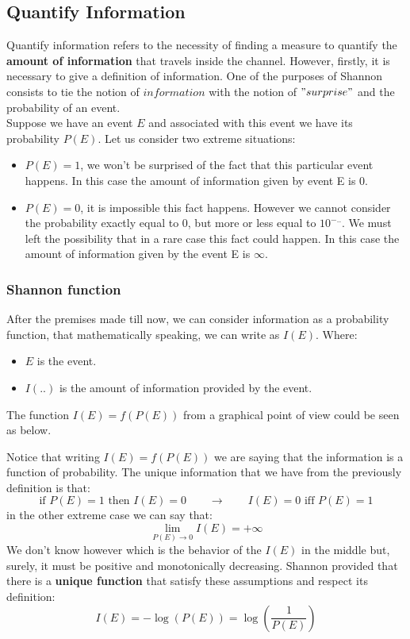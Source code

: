 \subsection{Quantify Information}
Quantify information refers to the necessity of finding a measure to quantify the \textbf{amount of information} that travels inside the channel. However, firstly, it is necessary to give a definition of information.
One of the purposes of Shannon consists to tie the notion of $information$ with the notion of $"surprise"$ and the probability of an event.\\
Suppose we have an event $E$ and associated with this event we have its probability $P(E)$. Let us consider two extreme situations:
\begin{itemize}
	\item $P(E) = 1$, we won't be surprised of the fact that this particular event happens. In this case the amount of information given by event E is 0.
	\item $P(E) = 0$, it is impossible this fact happens. However we cannot consider the probability exactly equal to 0, but more or less equal to $10^{-..}$. We must left the possibility that in a rare case this fact could happen. In this case the amount of information given by the event E is $\infty$.
\end{itemize}
\subsubsection{Shannon function} After the premises made till now, we can consider information as a probability function, that mathematically speaking, we can write as $I(E)$. Where:
\begin{itemize}
	\item $E$ is the event.
	\item $I(..)$ is the amount of information provided by the event. 
\end{itemize}
The function $I(E) = f(P(E))$ from a graphical point of view could be seen as below.

Notice that writing $I(E)= f(P(E))$ we are saying that the information is a function of probability.
The unique information that we have from the previously definition is that:
$$\text{if }P(E) = 1 \text{ then } I(E)=0 \qquad \longrightarrow \qquad I(E)=0 \text{ iff } P(E)=1$$
in the other extreme case we can say that:
$$\lim_{P(E)\rightarrow 0} I(E) = +\infty$$
We don't know however which is the behavior of the $I(E)$ in the middle but, surely, it must be positive and monotonically decreasing. Shannon provided that there is a \textbf{unique function} that satisfy these assumptions and respect its definition:
$$I(E) = -\log(P(E)) = \log\left(\frac{1}{P(E)}\right)$$


